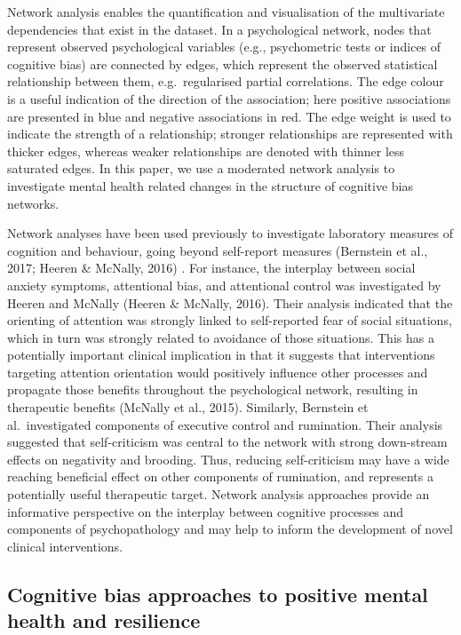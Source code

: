 \documentclass[man,floatsintext]{apa6}
\begin{document}
Network analysis enables the quantification and visualisation of the multivariate dependencies that exist in the dataset. In a psychological network, nodes that represent observed psychological variables (e.g., psychometric tests or indices of cognitive bias) are connected by edges, which represent the observed statistical relationship between them, e.g.~regularised partial correlations. The edge colour is a useful indication of the direction of the association; here positive associations are presented in blue and negative associations in red. The edge weight is used to indicate the strength of a relationship; stronger relationships are represented with thicker edges, whereas weaker relationships are denoted with thinner less saturated edges. In this paper, we use a moderated network analysis to investigate mental health related changes in the structure of cognitive bias networks.

Network analyses have been used previously to investigate laboratory measures of cognition and behaviour, going beyond self-report measures (Bernstein et al., 2017; Heeren \& McNally, 2016) . For instance, the interplay between social anxiety symptoms, attentional bias, and attentional control was investigated by Heeren and McNally (Heeren \& McNally, 2016). Their analysis indicated that the orienting of attention was strongly linked to self-reported fear of social situations, which in turn was strongly related to avoidance of those situations. This has a potentially important clinical implication in that it suggests that interventions targeting attention orientation would positively influence other processes and propagate those benefits throughout the psychological network, resulting in therapeutic benefits (McNally et al., 2015). Similarly, Bernstein et al.~investigated components of executive control and rumination. Their analysis suggested that self-criticism was central to the network with strong down-stream effects on negativity and brooding. Thus, reducing self-criticism may have a wide reaching beneficial effect on other components of rumination, and represents a potentially useful therapeutic target. Network analysis approaches provide an informative perspective on the interplay between cognitive processes and components of psychopathology and may help to inform the development of novel clinical interventions.

\hypertarget{cognitive-bias-approaches-to-positive-mental-health-and-resilience}{%
\subsection{Cognitive bias approaches to positive mental health and resilience}\label{cognitive-bias-approaches-to-positive-mental-health-and-resilience}}
\end{document}
